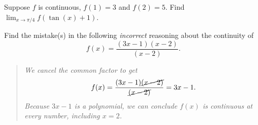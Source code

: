 \documentclass[../main.tex]{subfiles}
\begin{document}
\begin{example}
  Suppose \(f\) is continuous, \(f(1) = 3\) and \(f(2) = 5\).  Find \(\lim_{x \to \pi/4} f( \tan(x) + 1 )\).

\end{example}

\begin{example}
  Find the mistake(s) in the following \emph{incorrect} reasoning about the continuity of \[f(x) = \frac{(3x-1)(x-2)}{(x-2)}.\]
  \bigskip

  \begin{quote}
    \itshape
    We cancel the common factor to get
    \[
      f(x) = \frac{(3x - 1)\cancel{(x - 2)}}{\cancel{(x-2)}} = 3x - 1.
    \]
    Because \(3x - 1\) is a polynomial, we can conclude \(f(x)\) is continuous at every number, including \(x=2\).
  \end{quote}

\end{example}
\end{document}
